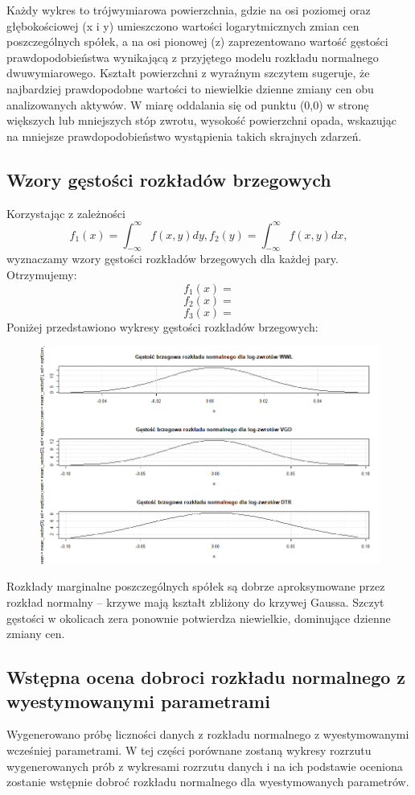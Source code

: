 \documentclass[a4paper,11pt]{article}
\begin{document}
Każdy wykres to trójwymiarowa powierzchnia, gdzie na osi poziomej oraz głębokościowej (x i y) umieszczono wartości logarytmicznych zmian cen poszczególnych spółek, a na osi pionowej (z) zaprezentowano wartość gęstości prawdopodobieństwa wynikającą z przyjętego modelu rozkładu normalnego dwuwymiarowego. Kształt powierzchni z wyraźnym szczytem sugeruje, że najbardziej prawdopodobne wartości to niewielkie dzienne zmiany cen obu analizowanych aktywów. W miarę oddalania się od punktu (0,0) w stronę większych lub mniejszych stóp zwrotu, wysokość powierzchni opada, wskazując na mniejsze prawdopodobieństwo wystąpienia takich skrajnych zdarzeń. 

\subsection{Wzory gęstości rozkładów brzegowych}
Korzystając z zależności
$$f_1(x)=\int_{-\infty}^{\infty}f(x,y)dy, f_2(y)=\int_{-\infty}^{\infty}f(x,y)dx,$$
wyznaczamy wzory gęstości rozkładów brzegowych dla każdej pary.\\ Otrzymujemy:
$$f_1(x)=$$
$$f_2(x)=$$
$$f_3(x)=$$
Poniżej przedstawiono wykresy gęstości rozkładów brzegowych:
\begin{figure}[H]
    \centering
    \includegraphics[width=1\textwidth]{./img/gestosci-brzegowe.png}
\end{figure}
Rozkłady marginalne poszczególnych spółek są dobrze aproksymowane przez rozkład normalny – krzywe mają kształt zbliżony do krzywej Gaussa. Szczyt gęstości w okolicach zera ponownie potwierdza niewielkie, dominujące dzienne zmiany cen.

\subsection{Wstępna ocena dobroci rozkładu normalnego z wyestymowanymi parametrami}
Wygenerowano próbę liczności danych z rozkładu normalnego z wyestymowanymi wcześniej parametrami. W tej części porównane zostaną wykresy rozrzutu wygenerowanych prób z wykresami rozrzutu danych i na ich podstawie oceniona zostanie wstępnie dobroć rozkładu normalnego dla wyestymowanych parametrów.
\end{document}
